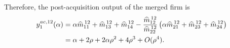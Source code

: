 Therefore, the post-acquisition output of the merged firm is
\begin{align}
y_{1}^{ac,12}(\alpha)
&=
\alpha\widehat m_{11}^{\,12}
+
\widehat m_{13}^{\,12}
+
\widehat m_{14}^{\,12}
-
\frac{
\widehat m_{12}^{\,12}
}{
\widehat m_{22}^{\,12}
}
\left(
\alpha\widehat m_{21}^{\,12}
+
\widehat m_{23}^{\,12}
+
\widehat m_{24}^{\,12}
\right)
\notag\\
&=
\alpha
+
2\rho
+
2\alpha\rho^2
+
4\rho^3
+
O(\rho^4).
\label{eq:explicit-net-output-alpha}
\end{align}
